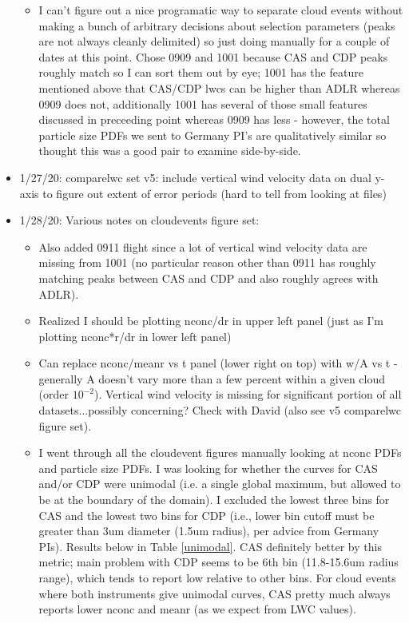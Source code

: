 \documentclass{article}
\begin{document}
\begin{itemize}
\begin{itemize}
			\item I can't figure out a nice programatic way to separate cloud events without making a bunch of arbitrary decisions about selection parameters (peaks are not always cleanly delimited) so just doing manually for a couple of dates at this point. Chose 0909 and 1001 because CAS and CDP peaks roughly match so I can sort them out by eye; 1001 has the feature mentioned above that CAS/CDP lwcs can be higher than ADLR whereas 0909 does not, additionally 1001 has several of those small features discussed in preceeding point whereas 0909 has less - however, the total particle size PDFs we sent to Germany PI's are qualitatively similar so thought this was a good pair to examine side-by-side. 
		\end{itemize}
	\item 1/27/20: comparelwc set v5: include vertical wind velocity data on dual y-axis to figure out extent of error periods (hard to tell from looking at files)
	\item 1/28/20: Various notes on cloudevents figure set:
		\begin{itemize}
			\item Also added 0911 flight since a lot of vertical wind velocity data are missing from 1001 (no particular reason other than 0911 has roughly matching peaks between CAS and CDP and also roughly agrees with ADLR).
			\item Realized I should be plotting nconc/dr in upper left panel (just as I'm plotting nconc*r/dr in lower left panel)
			\item Can replace nconc/meanr vs t panel (lower right on top) with w/A vs t - generally A doesn't vary more than a few percent within a given cloud (order $10^{-2}$). Vertical wind velocity is missing for significant portion of all datasets...possibly concerning? Check with David (also see v5 comparelwc figure set).
			\item I went through all the cloudevent figures manually looking at nconc PDFs and particle size PDFs. I was looking for whether the curves for CAS and/or CDP were unimodal (i.e. a single global maximum, but allowed to be at the boundary of the domain). I excluded the lowest three bins for CAS and the lowest two bins for CDP (i.e., lower bin cutoff must be greater than 3um diameter (1.5um radius), per advice from Germany PIs). Results below in Table \ref{unimodal}. CAS definitely better by this metric; main problem with CDP seems to be 6th bin (11.8-15.6um radius range), which tends to report low relative to other bins. For cloud events where both instruments give unimodal curves, CAS pretty much always reports lower nconc and meanr (as we expect from LWC values).

\end{itemize}
\end{itemize}
\end{document}

